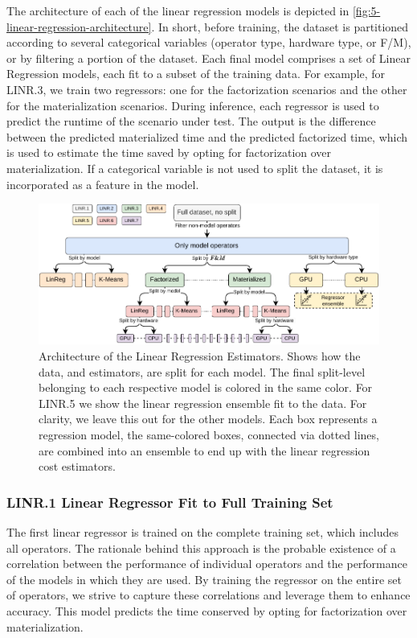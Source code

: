 The architecture of each of the linear regression models is depicted in \autoref{fig:5-linear-regression-architecture}. In short, before training, the dataset is partitioned according to several categorical variables (operator type, hardware type, or F/M), or by filtering a portion of the dataset. Each final model comprises a set of Linear Regression models, each fit to a subset of the training data. For example, for LINR.3, we train two regressors: one for the factorization scenarios and the other for the materialization scenarios. During inference, each regressor is used to predict the runtime of the scenario under test. The output is the difference between the predicted materialized time and the predicted factorized time, which is used to estimate the time saved by opting for factorization over materialization. If a categorical variable is not used to split the dataset, it is incorporated as a feature in the model.

\begin{figure}[ht]
    \centering
    \includegraphics[width=\linewidth]{chapters/05_cost_estimation/figures/statistical-architecture.pdf}
    \caption[Linear Regression Estimator Architecture]{Architecture of the Linear Regression Estimators. Shows how the data, and estimators, are split for each model. The final split-level belonging to each respective model is colored in the same color. For LINR.5 we show the linear regression ensemble fit to the data. For clarity, we leave this out for the other models. Each box represents a regression model, the same-colored boxes, connected via dotted lines, are combined into an ensemble to end up with the linear regression cost estimators.}
    \label{fig:5-linear-regression-architecture}
\end{figure}

\subsubsection*{LINR.1 Linear Regressor Fit to Full Training Set}
The first linear regressor is trained on the complete training set, which includes all operators. The rationale behind this approach is the probable existence of a correlation between the performance of individual operators and the performance of the models in which they are used. By training the regressor on the entire set of operators, we strive to capture these correlations and leverage them to enhance accuracy. This model predicts the time conserved by opting for factorization over materialization.

